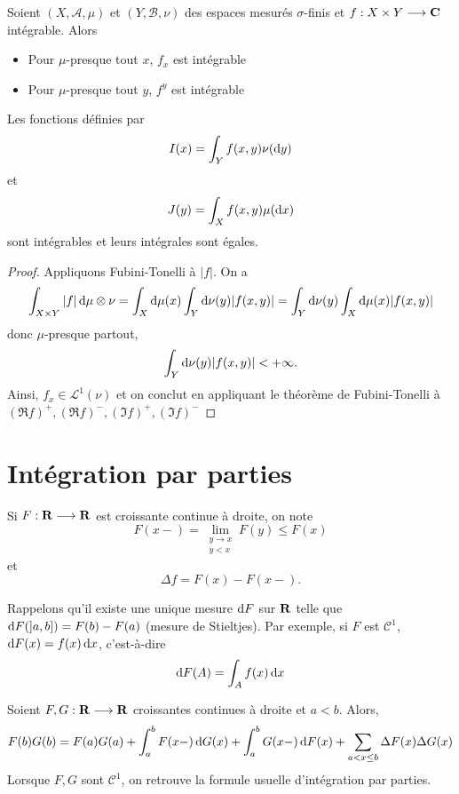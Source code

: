 \begin{thm}
    Soient $(X, \mathcal  A, \mu)$ et $(Y, \mathcal  B, \nu)$ des espaces mesurés $\sigma$-finis et  $f: X\times Y \longrightarrow  \mathbf C$ intégrable. Alors \begin{itemize}
        \item Pour $\mu$-presque tout  $x$,  $f_x$ est intégrable
        \item Pour $\mu$-presque tout  $y$,  $f^y$ est intégrable
    \end{itemize}
    Les fonctions définies par  \[I(x)=\int_Yf(x, y)\nu(\mathop{}\!\mathrm d y)\] et \[J(y)=\int_Xf(x, y)\mu(\mathop{}\!\mathrm d x)\] sont intégrables et leurs intégrales sont égales.
\end{thm}

\begin{proof}
    Appliquons Fubini-Tonelli à $|f|$. On a \[\int_{X\times Y}|f|\mathop{}\!\mathrm d \mu\otimes \nu=\int_X\mathop{}\!\mathrm d \mu(x)\int_Y\mathop{}\!\mathrm d \nu(y)|f(x,y)|=\int_Y\mathop{}\!\mathrm d\nu(y)\int_X\mathop{}\!\mathrm d\mu(x)|f(x,y)|\] donc $\mu$-presque partout, \[\int_Y\mathop{}\!\mathrm d\nu(y)|f(x,y)|<+\infty.\] Ainsi,  $f_x\in \mathcal L^1(\nu)$ et on conclut en appliquant le théorème de Fubini-Tonelli à $(\Re f)^+, (\Re f)^-, (\Im f)^+, (\Im f)^-$
\end{proof}

\section{Intégration par parties}

Si $F : \mathbf R \longrightarrow  \mathbf R$ est croissante continue à droite, on note \[F(x-)=\lim_{\substack{y\to x\\y<x}} F(y)\leq F(x)\] et \[\Delta f=F(x)-F(x-).\]

Rappelons qu'il existe une unique mesure $\mathop{}\!\mathrm d F$ sur  $ \mathbf R$ telle que $\mathop{}\!\mathrm d F(]a, b])=F(b)-F(a)$ (mesure de Stieltjes). Par exemple, si  $F$ est  $\mathcal  C^1$, $\mathop{}\!\mathrm d F(x)=f(x)\mathop{}\!\mathrm d x$, c'est-à-dire \[\mathop{}\!\mathrm d F(A)=\int_Af(x)\mathop{}\!\mathrm d x\]

\begin{thm}
    Soient $F, G : \mathbf R \longrightarrow  \mathbf R$ croissantes continues à droite et $a<b$. Alors, \[F(b)G(b)=F(a)G(a)+\int_a^bF(x-)\mathop{}\!\mathrm d G(x)+\int_a^bG(x-)\mathop{}\!\mathrm d F(x)+\sum_{a<x\leq b}\Delta F(x)\Delta G(x)\]
    Lorsque  $F, G$ sont  $\mathcal  C^1$, on retrouve la formule usuelle d'intégration par parties.
\end{thm}

